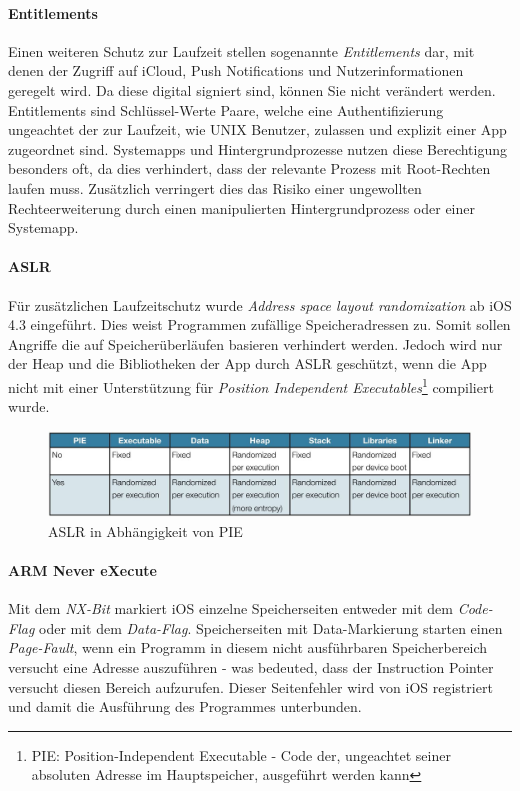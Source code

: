 		\paragraph{Entitlements}
			Einen weiteren Schutz zur Laufzeit stellen sogenannte \textsl{Entitlements}
			dar, mit denen der Zugriff auf iCloud, Push	Notifications und
			Nutzerinformationen geregelt wird. Da diese digital signiert sind, können Sie
			nicht verändert werden. Entitlements sind Schlüssel-Werte Paare, welche eine
			Authentifizierung ungeachtet der zur Laufzeit, wie UNIX Benutzer, zulassen
			und explizit einer App zugeordnet sind.
			Systemapps und Hintergrundprozesse nutzen diese Berechtigung besonders oft,
			da dies verhindert, dass der relevante Prozess mit Root-Rechten laufen muss.
			Zusätzlich verringert dies das Risiko einer ungewollten Rechteerweiterung
			durch einen manipulierten Hintergrundprozess oder einer Systemapp.
		
		\paragraph{ASLR}
			Für zusätzlichen Laufzeitschutz wurde \textsl{Address space layout
			randomization}\cite[S.1]{iOS4SecurityEvalutaion} ab iOS 4.3 eingeführt. Dies
			weist Programmen zufällige Speicheradressen zu. Somit sollen Angriffe die auf
			Speicherüberläufen basieren verhindert werden\cite[S.131]{Levin2012}. Jedoch
			wird nur der Heap und die Bibliotheken der App durch
			ASLR geschützt, wenn die App nicht mit einer Unterstützung für
			\textsl{Position Independent Executables}\footnote{PIE: Position-Independent
			Executable - Code der, ungeachtet seiner absoluten Adresse im Hauptspeicher,
			ausgeführt werden kann} compiliert wurde.
			\begin{figure}[h]
				\centering
				\includegraphics[width=0.9\linewidth]{ios/media/aslr-pie.jpg}
				\caption{ASLR in Abhängigkeit von PIE
				\cite[S.1]{iOS4SecurityEvalutaion}}
				\label{fig:aslr}
			\end{figure}
		
		\paragraph{ARM Never eXecute}
			Mit dem \textsl{NX-Bit} markiert iOS einzelne Speicherseiten entweder mit dem
			\textsl{Code-Flag} oder mit dem \textsl{Data-Flag}. Speicherseiten mit
			Data-Markierung starten einen \textsl{Page-Fault}, wenn ein Programm in
			diesem nicht ausführbaren Speicherbereich versucht eine Adresse auszuführen
			- was bedeuted, dass der Instruction Pointer versucht diesen Bereich
			aufzurufen. Dieser Seitenfehler wird von iOS registriert und damit die
			Ausführung des Programmes unterbunden\cite[S.310]{Levin2012}.